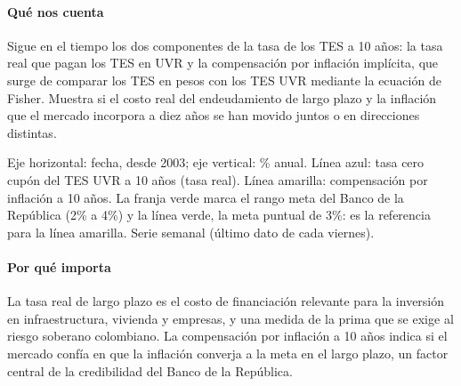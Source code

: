 \paragraph{Qué nos cuenta}
Sigue en el tiempo los dos componentes de la tasa de los TES a 10 años: la tasa real que pagan los TES en UVR y la compensación por inflación implícita, que surge de comparar los TES en pesos con los TES UVR mediante la ecuación de Fisher. Muestra si el costo real del endeudamiento de largo plazo y la inflación que el mercado incorpora a diez años se han movido juntos o en direcciones distintas.

\begin{leer}
Eje horizontal: fecha, desde 2003; eje vertical: \% anual. Línea azul: tasa cero cupón del TES UVR a 10 años (tasa real). Línea amarilla: compensación por inflación a 10 años. La franja verde marca el rango meta del Banco de la República (2\% a 4\%) y la línea verde, la meta puntual de 3\%: es la referencia para la línea amarilla. Serie semanal (último dato de cada viernes).
\end{leer}

\paragraph{Por qué importa}
La tasa real de largo plazo es el costo de financiación relevante para la inversión en infraestructura, vivienda y empresas, y una medida de la prima que se exige al riesgo soberano colombiano. La compensación por inflación a 10 años indica si el mercado confía en que la inflación converja a la meta en el largo plazo, un factor central de la credibilidad del Banco de la República.

